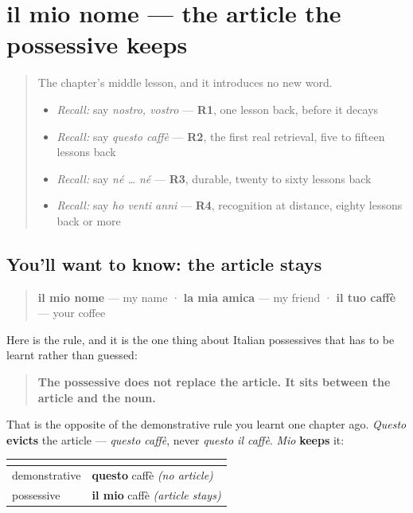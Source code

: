 \section[il mio nome]{il mio nome — the article the possessive keeps}

\label{lesson:IT-C34-il-mio-nome}



\begin{quote}
The chapter's middle lesson, and it introduces no new word.

\begin{itemize}
\raggedright
  \item \emph{Recall:} say \emph{nostro, vostro} — \textbf{R1}, one lesson back, before it decays
  \item \emph{Recall:} say \emph{questo caffè} — \textbf{R2}, the first real retrieval, five to fifteen lessons back
  \item \emph{Recall:} say \emph{né … né} — \textbf{R3}, durable, twenty to sixty lessons back
  \item \emph{Recall:} say \emph{ho venti anni} — \textbf{R4}, recognition at distance, eighty lessons back or more
\end{itemize}
\end{quote}

\subsection*{You'll want to know: the article stays}
\begin{quote}
\textbf{il mio nome} — my name · \textbf{la mia amica} — my friend · \textbf{il tuo caffè} — your coffee
\end{quote}

Here is the rule, and it is the one thing about Italian possessives that has to be learnt rather than guessed:

\begin{quote}
\textbf{The possessive does not replace the article. It sits between the article and the noun.}
\end{quote}

That is the opposite of the demonstrative rule you learnt one chapter ago. \emph{Questo} \textbf{evicts} the article — \emph{questo caffè}, never \emph{questo il caffè}. \emph{Mio} \textbf{keeps} it:

\noindent
\begin{tabularx}{\linewidth}{@{}>{\raggedright\arraybackslash}X>{\raggedright\arraybackslash}X@{}}
\toprule
\textbf{} & \textbf{} \\
\midrule
demonstrative & \textbf{questo} caffè \emph{(no article)} \\
possessive & \textbf{il mio} caffè \emph{(article stays)} \\
\bottomrule
\end{tabularx}

